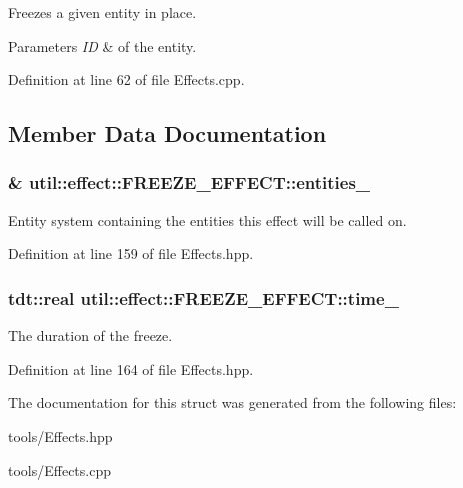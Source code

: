 Freezes a given entity in place. 


\begin{DoxyParams}{Parameters}
{\em ID} & of the entity. \\
\hline
\end{DoxyParams}


Definition at line 62 of file Effects.\+cpp.



\subsection{Member Data Documentation}
\subsubsection[{\texorpdfstring{entities\+\_\+}{entities_}}]{\& util\+::effect\+::\+F\+R\+E\+E\+Z\+E\+\_\+\+E\+F\+F\+E\+C\+T\+::entities\+\_\+\hspace{0.3cm}{\ttfamily [private]}}\hypertarget{structutil_1_1effect_1_1_f_r_e_e_z_e___e_f_f_e_c_t_a1ee6ce1353f02563e70a7c03cebebf4c}{}\label{structutil_1_1effect_1_1_f_r_e_e_z_e___e_f_f_e_c_t_a1ee6ce1353f02563e70a7c03cebebf4c}


Entity system containing the entities this effect will be called on. 



Definition at line 159 of file Effects.\+hpp.

\subsubsection[{\texorpdfstring{time\+\_\+}{time_}}]{\setlength{\rightskip}{0pt plus 5cm}tdt\+::real util\+::effect\+::\+F\+R\+E\+E\+Z\+E\+\_\+\+E\+F\+F\+E\+C\+T\+::time\+\_\+\hspace{0.3cm}{\ttfamily [private]}}\hypertarget{structutil_1_1effect_1_1_f_r_e_e_z_e___e_f_f_e_c_t_a075e8ad726e06baafced711a2209b55c}{}\label{structutil_1_1effect_1_1_f_r_e_e_z_e___e_f_f_e_c_t_a075e8ad726e06baafced711a2209b55c}


The duration of the freeze. 



Definition at line 164 of file Effects.\+hpp.



The documentation for this struct was generated from the following files\+:\begin{DoxyCompactItemize}
\item 
tools/Effects.\+hpp\item 
tools/Effects.\+cpp\end{DoxyCompactItemize}
